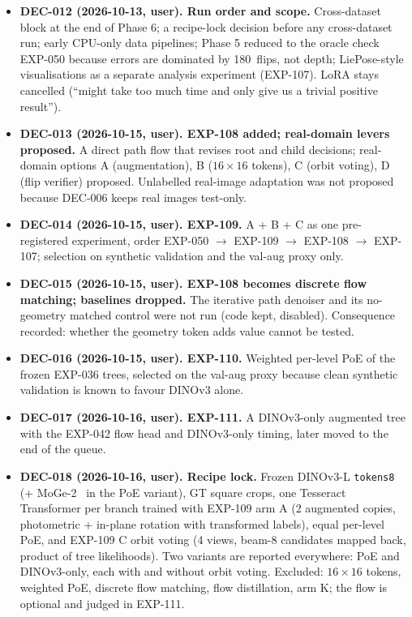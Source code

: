 \begin{itemize}
\item \textbf{DEC-012 (2026-10-13, user). Run order and scope.} Cross-dataset block at the end of Phase 6; a recipe-lock decision before any cross-dataset run; early CPU-only data pipelines; Phase 5 reduced to the oracle check EXP-050 because errors are dominated by 180\appDdeg\ flips, not depth; LiePose-style visualisations as a separate analysis experiment (EXP-107). LoRA stays cancelled (``might take too much time and only give us a trivial positive result'').
\item \textbf{DEC-013 (2026-10-15, user). EXP-108 added; real-domain levers proposed.} A direct path flow that revises root and child decisions; real-domain options A (augmentation), B ($16\times16$ tokens), C (orbit voting), D (flip verifier) proposed. Unlabelled real-image adaptation was not proposed because DEC-006 keeps real images test-only.
\item \textbf{DEC-014 (2026-10-15, user). EXP-109.} A + B + C as one pre-registered experiment, order EXP-050 $\to$ EXP-109 $\to$ EXP-108 $\to$ EXP-107; selection on synthetic validation and the val-aug proxy only.
\item \textbf{DEC-015 (2026-10-15, user). EXP-108 becomes discrete flow matching; baselines dropped.} The iterative path denoiser and its no-geometry matched control were not run (code kept, disabled). Consequence recorded: whether the geometry token adds value cannot be tested.
\item \textbf{DEC-016 (2026-10-15, user). EXP-110.} Weighted per-level PoE of the frozen EXP-036 trees, selected on the val-aug proxy because clean synthetic validation is known to favour DINOv3 alone.
\item \textbf{DEC-017 (2026-10-16, user). EXP-111.} A DINOv3-only augmented tree with the EXP-042 flow head and DINOv3-only timing, later moved to the end of the queue.
\item \textbf{DEC-018 (2026-10-16, user). Recipe lock.} Frozen DINOv3-L \texttt{tokens8} (+ MoGe-2 \appDnormals\ in the PoE variant), GT square crops, one Tesseract Transformer per branch trained with EXP-109 arm A (2 augmented copies, photometric + in-plane rotation with transformed labels), equal per-level PoE, and EXP-109 C orbit voting (4 views, beam-8 candidates mapped back, product of tree likelihoods). Two variants are reported everywhere: PoE and DINOv3-only, each with and without orbit voting. Excluded: $16\times16$ tokens, weighted PoE, discrete flow matching, flow distillation, arm K; the flow is optional and judged in EXP-111.

\end{itemize}
